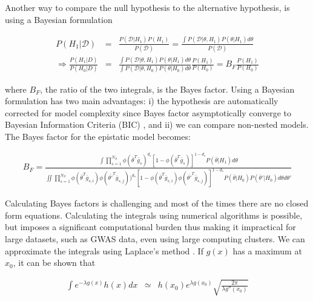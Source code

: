 Another way to compare the null hypothesis to the alternative hypothesis, is using a Bayesian formulation \cite{kass1995bayes, wakefield2009bayes}

\begin{eqnarray*}
	P(H_1 | \mathcal{D}) & = & \frac{ P( \mathcal{D} | H_1) P(H_1) }{ P(\mathcal{D}) } = \frac{ \int{ P(\mathcal{D} | \theta , H_1) P( \theta | H_1)  d\theta } }{ P(\mathcal{D}) }  \\
	\Rightarrow  \frac{ P(H_1 | D)  }{ P(H_0 | D)  } & = & \frac{ \int{ P(\mathcal{D} | \theta , H_1) P( \theta | H_1)  d\theta } }{\int{ P(\mathcal{D} | \theta , H_0 ) P( \theta | H_0)  d\theta } } \frac{ P(H_1) }{ P(H_0)  }  
	=  B_F \frac{ P(H_1) }{ P(H_0)  }
\end{eqnarray*}

\noindent where $B_F$, the ratio of the two integrals, is the Bayes factor. Using a Bayesian formulation has two main advantages: i) the hypothesis are automatically corrected for model complexity since Bayes factor asymptotically converge to Bayesian Information Criteria (BIC) \cite{kass1995bayes}, and ii) we can compare non-nested models. The Bayes factor for the epistatic model becomes:

\begin{eqnarray}\label{eq:bf2}
	B_F = \frac
	{ \int{ \prod_{s=1}^{N_S}{ \phi( \bar{\theta}^T \bar{g}_s)^{d_s} [ 1-\phi( \bar{\theta}^T \bar{g}_s) ]^{1-d_s} } P( \bar{\theta} | H_1)  d\theta } }
	{ \iint{ \prod_{s=1}^{N_S}{ 
	\phi( \bar{\theta}^T \bar{g}_{s,i}) 
	\phi( \bar{\theta'}^T \bar{g}_{s,j} ) )^{d_s} 
	[ 1-\phi( \bar{\theta}^T \bar{g}_{s,i}) \phi( \bar{\theta'}^T \bar{g}_{s,j} ) ]^{1-d_s} } 
	P( \bar{\theta} | H_0) 
	P( \bar{\theta}' | H_0)  
	d\theta d\theta' } }
\end{eqnarray}

Calculating Bayes factors is challenging and most of the times there are no closed form equations. Calculating the integrals using numerical algorithms is possible, but  imposes a significant computational burden thus making it impractical for large datasets, such as GWAS data, even using large computing clusters. We can approximate the integrals using Laplace's method  \cite{kass1995bayes}. If $g(x)$ has a maximum at $x_0$, it can be shown that

\begin{eqnarray*}
	\int{e^{-\lambda g(x)} h(x) dx} & \simeq & h(x_0) e^{\lambda g(x_0)} \sqrt{\frac{2 \pi}{\lambda g''(x_0)}} \\
\end{eqnarray*}

